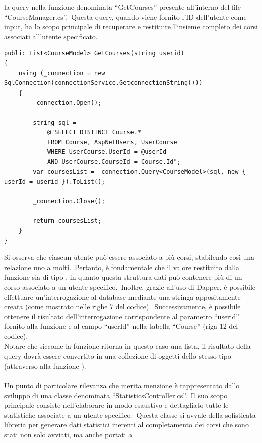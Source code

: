 la query nella funzione denominata ``GetCourses'' presente all'interno del file ``CourseManager.cs''.\ Questa query, 
quando viene fornito l'ID dell'utente come input, ha lo scopo principale di recuperare e restituire 
l'insieme completo dei corsi associati all'utente specificato.
%
\begin{lstlisting}[style=cs_style, caption=esempio funzione per l'esecuzione di una query da codice tramite il framework Dapper]
public List<CourseModel> GetCourses(string userid)
{
	using (_connection = new SqlConnection(connectionService.GetconnectionString()))
	{
		_connection.Open();

		string sql = 
			@"SELECT DISTINCT Course.* 
			FROM Course, AspNetUsers, UserCourse 
			WHERE UserCourse.UserId = @userId     
			AND UserCourse.CourseId = Course.Id";
		var coursesList = _connection.Query<CourseModel>(sql, new { userId = userid }).ToList();

		_connection.Close();

		return coursesList;
	}
} 
\end{lstlisting}
%
Si osserva che ciascun utente può essere associato a più corsi, 
stabilendo così una relazione uno a molti.\ Pertanto, è fondamentale 
che il valore restituito dalla funzione sia di tipo , 
in quanto questa struttura dati può contenere più di un corso associato a 
un utente specifico.\ Inoltre, grazie all'uso di Dapper, è possibile effettuare 
un'interrogazione al database mediante una stringa appositamente creata 
(come mostrato nelle righe 7 del codice).\ Successivamente, è possibile 
ottenere il risultato dell'interrogazione corrispondente al parametro ``userid'' 
fornito alla funzione e al campo ``userId'' nella tabella ``Course'' (riga 12 del codice).
\\
Notare che siccome la funzione ritorna in questo caso una lista, il risultato della query
dovrà essere convertito in una collezione di oggetti dello stesso tipo (attraverso alla funzione ).
%
\\ \\
%
Un punto di particolare rilevanza che merita menzione è rappresentato dallo sviluppo di una classe denominata 
``StatisticsController.cs''.\ Il suo scopo principale consiste nell'elaborare in modo esaustivo e dettagliato tutte 
le statistiche associate a un utente specifico.\ Questa classe si avvale della sofisticata libreria  
per generare dati statistici inerenti al completamento dei corsi che sono stati non solo avviati, ma anche portati a 
